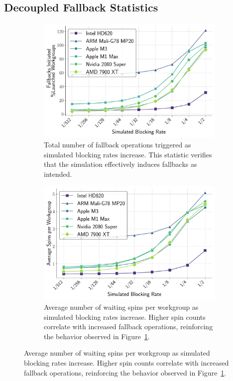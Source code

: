 \documentclass[sigconf,screen]{acmart}
\begin{document}
\subsection{Decoupled Fallback Statistics}
\begin{figure}
  \centering
  \begin{subfigure}[t]{0.48\linewidth}
    \centering
    \includegraphics[width=\linewidth]{graphics/fallbacksInitiated_plot.pdf}
    \caption{Total number of fallback operations triggered as simulated blocking rates increase. This statistic verifies that the simulation effectively induces fallbacks as intended.\label{fig:fallbacks_initiated}}
  \end{subfigure}\hfill
  \begin{subfigure}[t]{0.48\linewidth}
    \centering
    \includegraphics[width=\linewidth]{graphics/totalSpins_plot.pdf}
    \caption{Average number of waiting spins per workgroup as simulated blocking rates increase. Higher spin counts correlate with increased fallback operations, reinforcing the behavior observed in Figure~\ref{fig:fallbacks_initiated}.\label{fig:total_spins}}
  \end{subfigure}


\end{figure}
\end{document}
